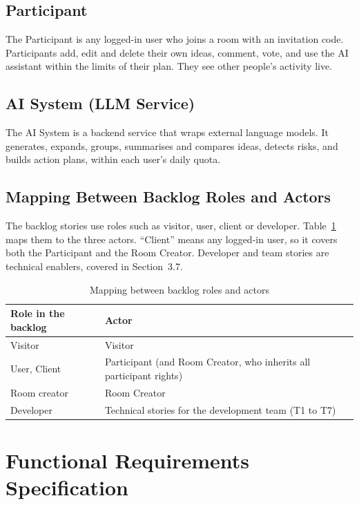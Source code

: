 \documentclass[12pt,a4paper]{report}
\begin{document}
\subsection{Participant}

The Participant is any logged-in user who joins a room with an invitation code. Participants add, edit and delete their own ideas, comment, vote, and use the AI assistant within the limits of their plan. They see other people's activity live.

\subsection{AI System (LLM Service)}

The AI System is a backend service that wraps external language models. It generates, expands, groups, summarises and compares ideas, detects risks, and builds action plans, within each user's daily quota.

\subsection{Mapping Between Backlog Roles and Actors}

The backlog stories use roles such as visitor, user, client or developer. Table~\ref{tab:role-mapping} maps them to the three actors. ``Client'' means any logged-in user, so it covers both the Participant and the Room Creator. Developer and team stories are technical enablers, covered in Section~3.7.

\begin{table}[htbp]
\centering
\caption{Mapping between backlog roles and actors}
\label{tab:role-mapping}
\begin{tabular}{@{}p{}p{}@{}}
\toprule
\textbf{Role in the backlog} & \textbf{Actor} \\
\midrule
Visitor & Visitor \\
User, Client & Participant (and Room Creator, who inherits all participant rights) \\
Room creator & Room Creator \\
Developer & Technical stories for the development team (T1 to T7) \\
\bottomrule
\end{tabular}
\end{table}

\section{Functional Requirements Specification}
\label{sec:functional}
\end{document}
